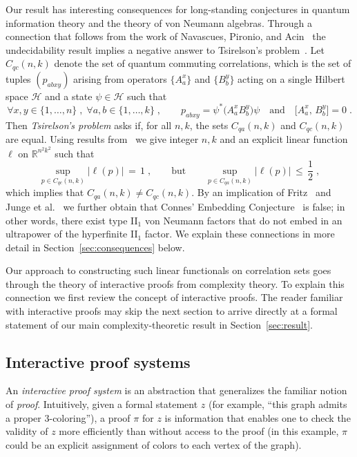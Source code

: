 \documentclass[11pt]{article}
\theoremstyle{definition}
\newcommand{\R}{\ensuremath{\mathbb{R}}}
\newcommand{\mH}{\ensuremath{\mathcal{H}}}
\begin{document}
Our result has interesting consequences for long-standing conjectures in quantum information theory and the theory of von Neumann algebras. Through a connection that follows from the work of Navascues, Pironio, and Acin~\cite{navascues2008convergent} the undecidability result implies a negative answer to Tsirelson's problem~\cite{Tsi06}. Let $C_{qc}(n,k)$ denote the set of quantum commuting correlations, which is the set of tuples $(p_{abxy})$ arising from operators $\{A^x_a\}$ and $\{B^y_b\}$ acting on a single Hilbert space $\mH$ and a state $\psi \in \mH$ such that
\begin{equation}\label{eq:intro-qc}
 \forall x,y\in \{1,\ldots,n\}\;,\;\forall a,b\in\{1,\ldots,k\}\;,\qquad p_{abxy} = \psi^* \big( A^x_a B^y_b\big) \psi \quad\text{and}\quad  \big[A^x_a,\,B^y_b\big]=0\;.
\end{equation}
Then \emph{Tsirelson's problem} asks if, for all $n,k$, the sets $C_{qa}(n,k)$ and $C_{qc}(n,k)$ are equal. 
Using results from~\cite{navascues2008convergent} we give integer $n,k$ and an explicit linear function $\ell$ on $\R^{n^2k^2}$ such that 
\[ \sup_{p\in C_{qc}(n,k)} \big|\ell(p)\big| \,=\,1\;,\qquad\text{but}\qquad \sup_{p\in C_{qa}(n,k)} \big|\ell(p)\big| \,\leq\,\frac{1}{2}\;,\]
which implies that $C_{qa}(n,k)\neq C_{qc}(n,k)$. 
By an implication of Fritz~\cite{fritz2012tsirelson} and Junge et al.~\cite{junge2011connes} we further obtain that Connes' Embedding Conjecture~\cite{connes1976classification} is false; in other words, there exist type II$_1$ von Neumann factors that do not embed in an ultrapower of the hyperfinite II$_1$ factor. We explain these connections in more detail in Section~\ref{sec:consequences} below.

Our approach to constructing such linear functionals on correlation sets goes through the theory of 
interactive proofs from complexity theory. 
To explain this connection we first review the concept of interactive proofs. The reader familiar with interactive proofs may skip the next section to arrive directly at a formal statement of our main complexity-theoretic result in Section~\ref{sec:result}. 

\subsection{Interactive proof systems}
An \emph{interactive proof system} is an abstraction that generalizes the familiar notion of \emph{proof}. Intuitively, given a formal statement $z$ (for example, ``this graph admits a proper $3$-coloring''), a proof $\pi$ for $z$ is information that enables one to check the validity of $z$ more efficiently than without access to the proof (in this example, $\pi$ could be an explicit assignment of colors to each vertex of the graph). 
\end{document}

